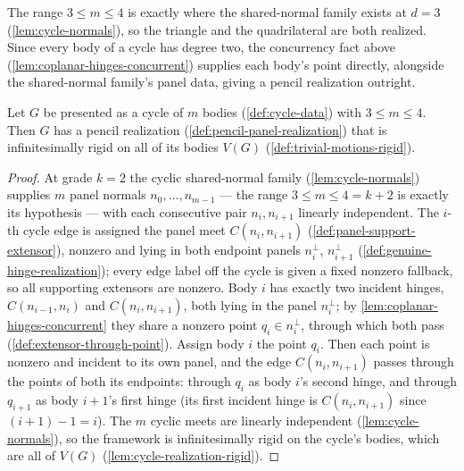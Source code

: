 The range $3 \le m \le 4$ is exactly where the shared-normal family
exists at $d = 3$ (\cref{lem:cycle-normals}), so the triangle and the
quadrilateral are both realized. Since every body of a cycle has degree
two, the concurrency fact above (\cref{lem:coplanar-hinges-concurrent})
supplies each body's point directly, alongside the shared-normal
family's panel data, giving a pencil realization outright.

\begin{lemma}
  \label{lem:cycle-pencil-realization}
  \leanok
  Let $G$ be presented as a cycle of $m$ bodies (\cref{def:cycle-data})
  with $3 \le m \le 4$. Then $G$ has a pencil realization
  (\cref{def:pencil-panel-realization}) that is infinitesimally rigid on
  all of its bodies $V(G)$ (\cref{def:trivial-motions-rigid}).
\end{lemma}
\begin{proof}
  \leanok
  At grade $k = 2$ the cyclic shared-normal family
  (\cref{lem:cycle-normals}) supplies $m$ panel normals $n_0, \dots,
  n_{m-1}$ --- the range $3 \le m \le 4 = k + 2$ is exactly its
  hypothesis --- with each consecutive pair $n_i, n_{i+1}$ linearly
  independent. The $i$-th cycle edge is assigned the panel meet
  $C(n_i, n_{i+1})$ (\cref{def:panel-support-extensor}), nonzero and lying
  in both endpoint panels $n_i^{\perp}$, $n_{i+1}^{\perp}$
  (\cref{def:genuine-hinge-realization}); every edge label off the cycle
  is given a fixed nonzero fallback, so all supporting extensors are
  nonzero. Body $i$ has exactly two incident hinges, $C(n_{i-1}, n_i)$ and
  $C(n_i, n_{i+1})$, both lying in the panel $n_i^{\perp}$; by
  \cref{lem:coplanar-hinges-concurrent} they share a nonzero point
  $q_i \in n_i^{\perp}$, through which both pass
  (\cref{def:extensor-through-point}). Assign body $i$ the point $q_i$.
  Then each point is nonzero and incident to its own panel, and the
  edge $C(n_i, n_{i+1})$ passes through the points of both its endpoints:
  through $q_i$ as body $i$'s second hinge, and through $q_{i+1}$ as body
  $i+1$'s first hinge (its first incident hinge is $C(n_i, n_{i+1})$
  since $(i+1) - 1 = i$). The $m$ cyclic meets are linearly independent
  (\cref{lem:cycle-normals}), so the framework is infinitesimally rigid on
  the cycle's bodies, which are all of $V(G)$ (\cref{lem:cycle-realization-rigid}).
\end{proof}

